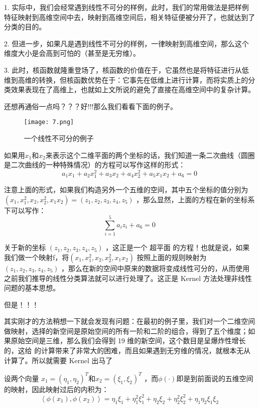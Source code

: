 \documentclass[UTF8]{article}
\begin{document}
1.	实际中，我们会经常遇到线性不可分的样例，此时，我们的常用做法是把样例特征映射到高维空间中去，映射到高维空间后，相关特征便被分开了，也就达到了分类的目的。

2.	但进一步，如果凡是遇到线性不可分的样例，一律映射到高维空间，那么这个维度大小是会高到可怕的（甚至是无穷维）。

3.	此时，核函数就隆重登场了，核函数的价值在于，它虽然也是将特征进行从低维到高维的转换，但核函数优势在于：它事先在低维上进行计算，而将实质上的分类效果表现在了高维上，也就如上文所说的避免了直接在高维空间中的复杂计算。

还想再通俗一点吗？？？好!!!那么我们看看下面的例子。
 \begin{figure}[H]
 	\centering
 	\texttt{[image: 7.png]}
 	\caption{一个线性不可分的例子}
 \end{figure}
 
 如果用$x_1$和$x_2$来表示这个二维平面的两个坐标的话，我们知道一条二次曲线（圆圈是二次曲线的一种特殊情况）的方程可以写作这样的形式：
 \begin{equation}
 	a_1x_1+a_2x_1^2+a_3x_2+a_4x_2^2+a_5x_1x_2+a_6 = 0
 \end{equation}

 注意上面的形式，如果我们构造另外一个五维的空间，其中五个坐标的值分别为 $(x_1,x_1^2,x_2,x_2^2,x_1x_2)=(z_1,z_2,z_3,z_4,z_5)$ ，那么显然，上面的方程在新的坐标系下可以写作：
 \begin{equation}
 \sum\limits_{i= 1}^5a_iz_i+a_6 = 0
 \end{equation}

 关于新的坐标 $(z_1,z_2,z_3,z_4,z_5)$ ，这正是一个 超平面 的方程！也就是说，如果我们做一个映射f，将$(x_1,x_1^2,x_2,x_2^2,x_1x_2)$ 按照上面的规则映射为$(z_1,z_2,z_3,z_4,z_5)$  ，那么在新的空间中原来的数据将变成线性可分的，从而使用之前我们推导的线性分类算法就可以进行处理了。这正是 Kernel 方法处理非线性问题的基本思想。
 
 但是！！！
 
 其实刚才的方法稍想一下就会发现有问题：在最初的例子里，我们对一个二维空间做映射，选择的新空间是原始空间的所有一阶和二阶的组合，得到了五个维度；如果原始空间是三维，那么我们会得到 19 维的新空间，这个数目是呈爆炸性增长的，这给  的计算带来了非常大的困难，而且如果遇到无穷维的情况，就根本无从计算了。所以就需要 Kernel 出马了
 
 设两个向量 $x_1 = (\eta_1,\eta_2)^T$和$x_2 = (\xi_1,\xi_2)^T$ ，而$\phi(\cdot)$即是到前面说的五维空间的映射，因此映射过后的内积为：
 \begin{equation}
 	\left\langle\phi(x_1),\phi(x_2)\right\rangle = \eta_1\xi_1+\eta_1^2\xi_1^2+\eta_2\xi_2+\eta_2^2\xi_2^2+\eta_1\eta_2\xi_1\xi_2
 \end{equation}
\end{document}
